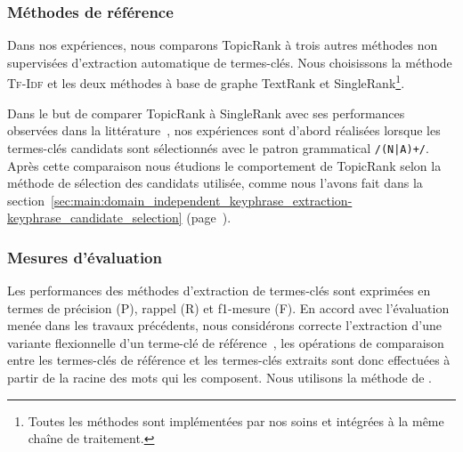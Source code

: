       \subsubsection{Méthodes de référence}
      \label{subsubsec:main:domain_independent_keyphrase_extraction-unsupervised_automatic_keyphrase_extraction-evaluation-baselines}
        Dans nos expériences, nous comparons TopicRank à trois autres
        méthodes non supervisées d'extraction automatique de termes-clés. Nous
        choisissons la méthode \textsc{Tf-Idf} et les deux méthodes à base de
        graphe TextRank et SingleRank\footnote{Toutes les méthodes sont
        implémentées par nos soins et intégrées à la même chaîne de
        traitement.}.
        
        Dans le but de comparer TopicRank à SingleRank avec ses performances
        observées dans la littérature~\cite{hassan2010conundrums}, nos
        expériences sont d'abord réalisées lorsque les termes-clés candidats
        sont sélectionnés avec le patron grammatical \texttt{/(N|A)+/}. Après
        cette comparaison nous étudions le comportement de TopicRank selon la
        méthode de sélection des candidats utilisée, comme nous l'avons fait
        dans la
        section~\ref{sec:main:domain_independent_keyphrase_extraction-keyphrase_candidate_selection}
        (page~\pageref{sec:main:domain_independent_keyphrase_extraction-keyphrase_candidate_selection}).

      \subsubsection{Mesures d'évaluation}
      \label{subsubsec:main:domain_independent_keyphrase_extraction-unsupervised_automatic_keyphrase_extraction-evaluation-evaluation_measures}
        Les performances des méthodes d'extraction de termes-clés sont exprimées
        en termes de précision (P), rappel (R) et f1-mesure (F). En
        accord avec l'évaluation menée dans les travaux précédents, nous
        considérons correcte l'extraction d'une variante flexionnelle d'un
        terme-clé de référence~\cite{kim2010semeval}, les opérations de
        comparaison entre les termes-clés de référence et les termes-clés
        extraits sont donc effectuées à partir de la racine des mots qui les
        composent. Nous utilisons la méthode de
        .

